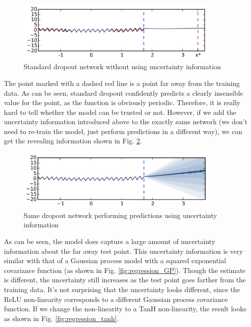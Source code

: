 \begin{figure}[H]
    \centering
    \includegraphics[width=10cm]{labs/12/images/Regression without uncertainty.png}
    \caption{Standard dropout network without using uncertainty information}
    \label{fig:regression_without_uncertainty}
\end{figure}

The point marked with a dashed red line is a point far away from the training data. As can be seen, standard dropout confidently predicts a clearly insensible value for the point, as the function is obviously periodic. Therefore, it is really hard to tell whether the model can be trusted or not. However, if we add the uncertainty information introduced above to the exactly same network (we don't need to re-train the model, just perform predictions in a different way), we can get the revealing information shown in Fig. \ref{fig:regression_with_uncertainty}.

\begin{figure}[H]
    \centering
    \includegraphics[width=10cm]{labs/12/images/Regression with uncertainty.png}
    \caption{Same dropout network performing predictions using uncertainty information}
    \label{fig:regression_with_uncertainty}
\end{figure}

As can be seen, the model does capture a large amount of uncertainty information about the far away test point. This uncertainty information is very similar with that of a Gaussian process model with a squared exponential covariance function (as shown in Fig. \ref{fig:regression_GP}). Though the estimate is different, the uncertainty still increases as the test point goes farther from the training data. It's not surprising that the uncertainty looks different, since the ReLU non-linearity corresponds to a different Gaussian process covariance function. If we change the non-linearity to a TanH non-linearity, the result looks as shown in Fig. \ref{fig:regression_tanh}.

